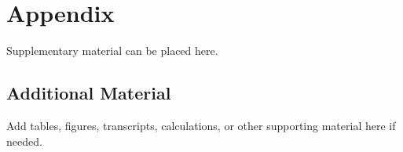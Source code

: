 
\section{Appendix}

Supplementary material can be placed here.

\subsection{Additional Material}

Add tables, figures, transcripts, calculations, or other supporting material here if needed.